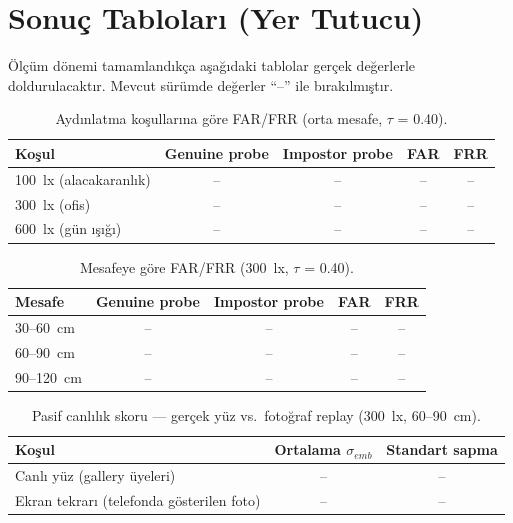 \section{Sonuç Tabloları (Yer Tutucu)}
\label{sec:sonuc-tablolari}

Ölçüm dönemi tamamlandıkça aşağıdaki tablolar gerçek değerlerle
doldurulacaktır. Mevcut sürümde değerler ``--'' ile bırakılmıştır.

\begin{table}[h!]
\centering
\caption{Aydınlatma koşullarına göre FAR/FRR (orta mesafe, $\tau$ = 0.40).}
\label{tab:results-light}
\small
\begin{tabular}{l c c c c}
\toprule
\textbf{Koşul} & \textbf{Genuine probe} & \textbf{Impostor probe} & \textbf{FAR} & \textbf{FRR}\\
\midrule
100~lx (alacakaranlık) & -- & -- & -- & --\\
300~lx (ofis)          & -- & -- & -- & --\\
600~lx (gün ışığı)     & -- & -- & -- & --\\
\bottomrule
\end{tabular}
\end{table}

\begin{table}[h!]
\centering
\caption{Mesafeye göre FAR/FRR (300~lx, $\tau$ = 0.40).}
\label{tab:results-distance}
\small
\begin{tabular}{l c c c c}
\toprule
\textbf{Mesafe}  & \textbf{Genuine probe} & \textbf{Impostor probe} & \textbf{FAR} & \textbf{FRR}\\
\midrule
30--60~cm   & -- & -- & -- & --\\
60--90~cm   & -- & -- & -- & --\\
90--120~cm  & -- & -- & -- & --\\
\bottomrule
\end{tabular}
\end{table}

\begin{table}[h!]
\centering
\caption{Pasif canlılık skoru — gerçek yüz vs.\ fotoğraf replay (300~lx, 60--90~cm).}
\label{tab:results-liveness}
\small
\begin{tabular}{l c c}
\toprule
\textbf{Koşul} & \textbf{Ortalama $\sigma_{emb}$} & \textbf{Standart sapma}\\
\midrule
Canlı yüz (gallery üyeleri) & -- & --\\
Ekran tekrarı (telefonda gösterilen foto) & -- & --\\
\bottomrule
\end{tabular}
\end{table}

